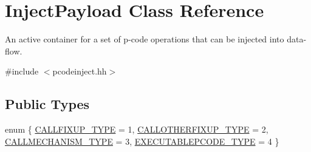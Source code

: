 \hypertarget{class_inject_payload}{}\section{Inject\+Payload Class Reference}
\label{class_inject_payload}


An active container for a set of p-\/code operations that can be injected into data-\/flow.  




{\ttfamily \#include $<$pcodeinject.\+hh$>$}

\subsection*{Public Types}
\begin{DoxyCompactItemize}
\item 
enum \{ \mbox{\hyperlink{class_inject_payload_aa532c3794a8b6038bbfa504ace6d4ad7ad5a56c387d306b588447302bfc5191bc}{C\+A\+L\+L\+F\+I\+X\+U\+P\+\_\+\+T\+Y\+PE}} = 1, 
\mbox{\hyperlink{class_inject_payload_aa532c3794a8b6038bbfa504ace6d4ad7af515674963cd64df082ce77405b16ab0}{C\+A\+L\+L\+O\+T\+H\+E\+R\+F\+I\+X\+U\+P\+\_\+\+T\+Y\+PE}} = 2, 
\mbox{\hyperlink{class_inject_payload_aa532c3794a8b6038bbfa504ace6d4ad7a2b4614762d55c0714e810f44edd13f3b}{C\+A\+L\+L\+M\+E\+C\+H\+A\+N\+I\+S\+M\+\_\+\+T\+Y\+PE}} = 3, 
\mbox{\hyperlink{class_inject_payload_aa532c3794a8b6038bbfa504ace6d4ad7af8896eeef2d6363d716fe654995671b8}{E\+X\+E\+C\+U\+T\+A\+B\+L\+E\+P\+C\+O\+D\+E\+\_\+\+T\+Y\+PE}} = 4
 \}
\end{DoxyCompactItemize}
